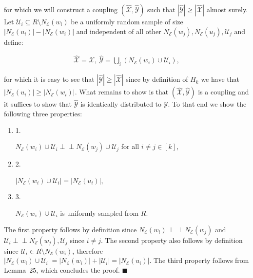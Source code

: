\documentclass[10pt,a4paper]{article}
\begin{document}
for which we will construct a coupling $(\hat{\mathcal{X}},\hat{\mathcal{Y}})$ such that $|\hat{\mathcal{Y}}|\geq|\hat{\mathcal{X}}|$ almost surely.
Let $\mathcal{U}_{i}\subseteq R\setminus N_{\mathcal{E}}(w_{i})$ be a uniformly random sample of size $|N_{\mathcal{E}}(u_{i})|-|N_{\mathcal{E}}(w_{i})|$ and independent of all other $N_{\mathcal{E}}(w_{j}),N_{\mathcal{E}}(u_{j}),\mathcal{U}_{j}$ and define:\par


\[\begin{gathered}
\displaystyle\hat{\mathcal{X}}=\mathcal{X},\ \hat{\mathcal{Y}}=\bigcup_{i}\left(N_{\mathcal{E}}(w_{i})\cup\mathcal{U}_{i}\right),
\end{gathered}\]


for which it is easy to see that $|\hat{\mathcal{Y}}|\geq|\hat{\mathcal{X}}|$ since by definition of $H_{k}$ we have that $|N_{\mathcal{E}}(u_{i})|\geq|N_{\mathcal{E}}(w_{i})|$.
What remains to show is that $(\hat{\mathcal{X}},\hat{\mathcal{Y}})$ is a coupling and it suffices to show that $\hat{\mathcal{Y}}$ is identically distributed to $\mathcal{Y}$.
To that end we show the following three properties:\par


\begin{enumerate}


\item[] 1. 


$N_{\mathcal{E}}(w_{i})\cup\mathcal{U}_{i}\perp\!\!\!\!\perp N_{\mathcal{E}}(w_{j})\cup\mathcal{U}_{j}$ for all $i\neq j\in[k]$,\par




\item[] 2. 


$|N_{\mathcal{E}}(w_{i})\cup\mathcal{U}_{i}|=|N_{\mathcal{E}}(u_{i})|$,\par




\item[] 3. 


$N_{\mathcal{E}}(w_{i})\cup\mathcal{U}_{i}$ is uniformly sampled from $R$.\par




\end{enumerate}


The first property follows by definition since $N_{\mathcal{E}}(w_{i})\perp\!\!\!\!\perp N_{\mathcal{E}}(w_{j})$ and $\mathcal{U}_{i}\perp\!\!\!\!\perp N_{\mathcal{E}}(w_{j}),\mathcal{U}_{j}$ since $i\neq j$.
The second property also follows by definition since $\mathcal{U}_{i}\in R\setminus N_{\mathcal{E}}(w_{i})$, therefore $|N_{\mathcal{E}}(w_{i})\cup\mathcal{U}_{i}|=|N_{\mathcal{E}}(w_{i})|+|\mathcal{U}_{i}|=|N_{\mathcal{E}}(u_{i})|$.
The third property follows from Lemma 25, which concludes the proof.
\ensuremath{\blacksquare}\par
\end{document}

